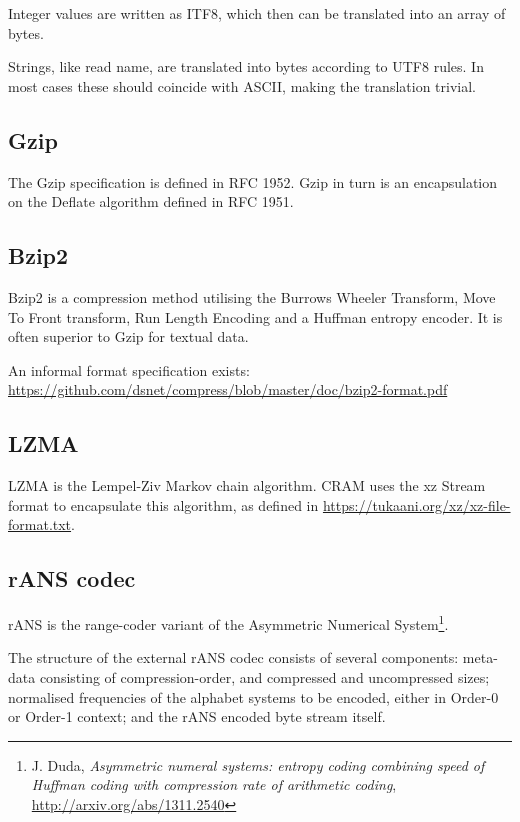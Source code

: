 \documentclass[a4paper]{article}
\begin{document}
Integer values are written as ITF8, which then can be translated into an array 
of bytes. 

Strings, like read name, are translated into bytes according to UTF8 rules. In 
most cases these should coincide with ASCII, making the translation trivial. 

\subsection{\textbf{Gzip}}

The Gzip specification is defined in RFC 1952.
Gzip in turn is an encapsulation on the Deflate algorithm defined in RFC 1951.

\subsection{\textbf{Bzip2}}

Bzip2 is a compression method utilising the Burrows Wheeler Transform, Move To Front transform, Run Length Encoding and a Huffman entropy encoder. 
It is often superior to Gzip for textual data.

An informal format specification exists:\\
\url{https://github.com/dsnet/compress/blob/master/doc/bzip2-format.pdf}

\subsection{\textbf{LZMA}}

LZMA is the Lempel-Ziv Markov chain algorithm.
CRAM uses the xz Stream format to encapsulate this algorithm, as defined in \url{https://tukaani.org/xz/xz-file-format.txt}.

\subsection{\textbf{rANS codec}}

rANS is the range-coder variant of the Asymmetric Numerical
System\footnote{J. Duda, \textit{Asymmetric numeral systems: entropy
    coding combining speed of Huffman coding with compression rate of
    arithmetic coding}, \url{http://arxiv.org/abs/1311.2540}}.

The structure of the external rANS codec consists of several
components: meta-data consisting of compression-order, and compressed
and uncompressed sizes; normalised frequencies of the alphabet systems
to be encoded, either in Order-0 or Order-1 context; and the rANS
encoded byte stream itself.
\end{document}
